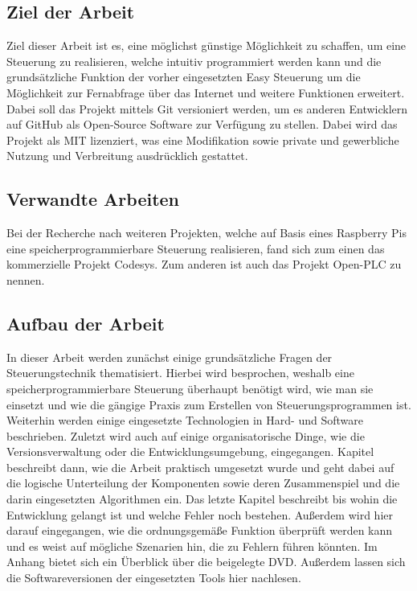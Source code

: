 \subsection{Ziel der Arbeit}
Ziel dieser Arbeit ist es, eine möglichst günstige Möglichkeit zu schaffen, um eine Steuerung zu realisieren, welche intuitiv programmiert werden kann und die grundsätzliche Funktion der vorher eingesetzten Easy Steuerung um die Möglichkeit zur Fernabfrage über das Internet und weitere Funktionen erweitert. Dabei soll das Projekt mittels Git\cite{BOOK:GIT} versioniert werden, um es anderen Entwicklern auf GitHub als Open-Source Software zur Verfügung zu stellen. Dabei wird das Projekt als MIT lizenziert, was eine Modifikation sowie private und gewerbliche Nutzung und Verbreitung ausdrücklich gestattet. 
\subsection{Verwandte Arbeiten}
Bei der Recherche nach weiteren Projekten, welche auf Basis eines Raspberry Pis eine speicherprogrammierbare Steuerung realisieren, fand sich zum einen das kommerzielle Projekt Codesys\cite{URL:Codesys}. Zum anderen ist auch das Projekt Open-PLC zu nennen\cite{URL:OpenPLC}. 
\subsection{Aufbau der Arbeit}
In dieser Arbeit werden zunächst einige grundsätzliche Fragen der Steuerungstechnik thematisiert. Hierbei wird besprochen, weshalb eine speicherprogrammierbare Steuerung überhaupt benötigt wird, wie man sie einsetzt und wie die gängige Praxis zum Erstellen von Steuerungsprogrammen ist. Weiterhin werden einige eingesetzte Technologien in Hard- und Software beschrieben. Zuletzt wird auch auf einige organisatorische Dinge, wie die Versionsverwaltung oder die Entwicklungsumgebung, eingegangen. Kapitel  beschreibt dann, wie die Arbeit praktisch umgesetzt wurde und geht dabei auf die logische Unterteilung der Komponenten sowie deren Zusammenspiel und die darin eingesetzten Algorithmen ein. Das letzte Kapitel beschreibt bis wohin die Entwicklung gelangt ist und welche Fehler noch bestehen. Außerdem wird hier darauf eingegangen, wie die ordnungsgemäße Funktion überprüft werden kann und es weist auf mögliche Szenarien hin, die zu Fehlern führen könnten. Im Anhang bietet sich ein Überblick über die beigelegte DVD. Außerdem lassen sich die Softwareversionen der eingesetzten Tools hier nachlesen.

\clearpage
